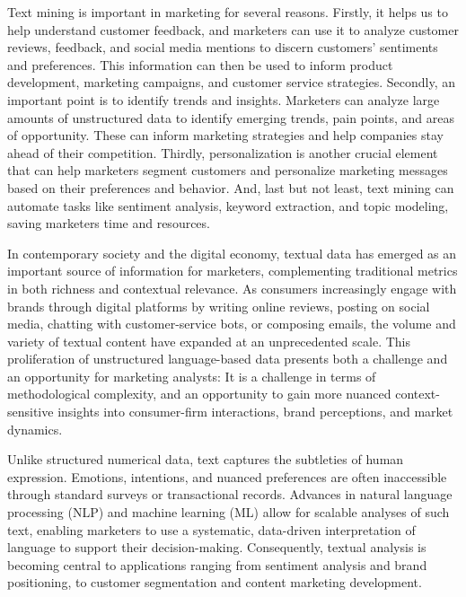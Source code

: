 Text mining is important in marketing for several reasons. Firstly, it helps us to help understand customer feedback, and marketers can use it to analyze customer reviews, feedback, and social media mentions to discern customers' sentiments and preferences. This information can then be used to inform product development, marketing campaigns, and customer service strategies. Secondly, an important point is to identify trends and insights. Marketers can analyze large amounts of unstructured data to identify emerging trends, pain points, and areas of opportunity. These can inform marketing strategies and help companies stay ahead of their competition. Thirdly, personalization is another crucial element that can help marketers segment customers and personalize marketing messages based on their preferences and behavior. And, last but not least, text mining can automate tasks like sentiment analysis, keyword extraction, and topic modeling, saving marketers time and resources.

In contemporary society and the digital economy, textual data has emerged as an important source of information for marketers, complementing traditional metrics in both richness and contextual relevance. As consumers increasingly engage with brands through digital platforms by writing online reviews, posting on social media, chatting with customer-service bots, or composing emails, the volume and variety of textual content have expanded at an unprecedented scale. This proliferation of unstructured language-based data presents both a challenge and an opportunity for marketing analysts: It is a challenge in terms of methodological complexity, and an opportunity to gain more nuanced context-sensitive insights into consumer-firm interactions, brand perceptions, and market dynamics.

Unlike structured numerical data, text captures the subtleties of human expression. Emotions, intentions, and nuanced preferences are often inaccessible through standard surveys or transactional records. Advances in natural language processing (NLP) and machine learning (ML) allow for scalable analyses of such text, enabling marketers to use a systematic, data-driven interpretation of language to support their decision-making. Consequently, textual analysis is becoming central to applications ranging from sentiment analysis and brand positioning, to customer segmentation and content marketing development.


